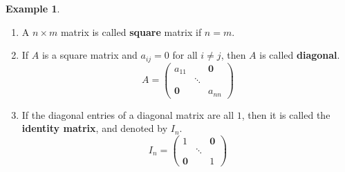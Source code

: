 \documentclass{beamer}
\theoremstyle{plain}
\theoremstyle{definition}
\newtheorem{exmp}[thm]{Example}
\begin{document}
\begin{frame}
\begin{exmp}\*
\begin{enumerate}
	\item A $n\times m$ matrix is called \textbf{square} matrix if $n=m$.
	\item If $A$ is a square matrix and $a_{ij}=0$ for all $i\neq j$, then $A$ is called \textbf{diagonal}.
	$$A = \begin{pmatrix}
	a_{11} &  & \mathbf 0 \\
	& \ddots & \\
	\mathbf 0 & & a_{nn}
	\end{pmatrix}$$
	\item If the diagonal entries of a diagonal matrix are all $1$, then it is called the \textbf{identity matrix}, and denoted by $I_n$.
	$$I_n = \begin{pmatrix}
	1 &  & \mathbf 0 \\
	& \ddots & \\
	\mathbf 0 & & 1
	\end{pmatrix}$$
\end{enumerate}
\end{exmp}
\end{frame}
\end{document}

